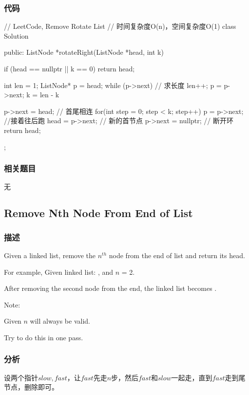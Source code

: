 \subsubsection{代码}
\begin{Code}
// LeetCode, Remove Rotate List
// 时间复杂度O(n)，空间复杂度O(1)
class Solution {
public:
    ListNode *rotateRight(ListNode *head, int k) {
        if (head == nullptr || k == 0) return head;

        int len = 1;
        ListNode* p = head;
        while (p->next) { // 求长度
            len++;
            p = p->next;
        }
        k = len - k %

        p->next = head; // 首尾相连
        for(int step = 0; step < k; step++) {
            p = p->next;  //接着往后跑
        }
        head = p->next; // 新的首节点
        p->next = nullptr; // 断开环
        return head;
    }
};
\end{Code}


\subsubsection{相关题目}

\begindot
\item 无
\myenddot


\subsection{Remove Nth Node From End of List}
\label{sec:remove-nth-node-from-end-of-list}


\subsubsection{描述}
Given a linked list, remove the $n^{th}$ node from the end of list and return its head.

For example, Given linked list: , and $n$ = 2.

After removing the second node from the end, the linked list becomes .

Note:
\begindot
\item Given $n$ will always be valid.
\item Try to do this in one pass.
\myenddot


\subsubsection{分析}
设两个指针$slow,fast$，让$fast$先走$n$步，然后$fast$和$slow$一起走，直到$fast$走到尾节点，删除即可。

